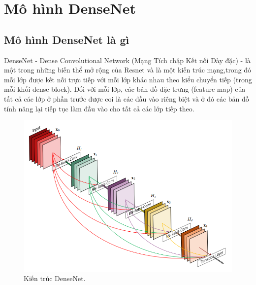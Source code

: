 \section{Mô hình DenseNet}
\subsection{Mô hình DenseNet là gì}
DenseNet - Dense Convolutional Network (Mạng Tích chập Kết nối Dày đặc) - là một trong những biến thể mở rộng của Resnet và là một kiến trúc mạng,trong đó mỗi lớp được kết nối trực tiếp với mỗi lớp khác nhau theo kiểu chuyển tiếp (trong mỗi khối dense block). Đối với mỗi lớp, các bản đồ đặc trưng (feature map) của tất cả các lớp ở phần trước được coi là các đầu vào riêng biệt và ở đó các bản đồ tính năng lại tiếp tục làm đầu vào cho tất cả các lớp tiếp theo. 

\begin{figure}[H]
	\centering
	\includegraphics[width=0.8\linewidth]{images/densenet_hl}
	\caption{Kiến trúc DenseNet.}
	\label{fig:kien_truc_densenet}
\end{figure} 

